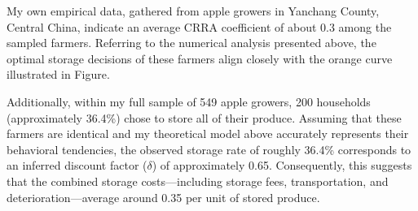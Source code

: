 \documentclass[12pt]{article}
\begin{document}
My own empirical data, gathered from apple growers in Yanchang County, Central China, indicate an average CRRA coefficient of about 0.3 among the sampled farmers. Referring to the numerical analysis presented above, the optimal storage decisions of these farmers align closely with the orange curve illustrated in Figure.

Additionally, within my full sample of 549 apple growers, 200 households (approximately 36.4\%) chose to store all of their produce. Assuming that these farmers are identical and my theoretical model above accurately represents their behavioral tendencies, the observed storage rate of roughly 36.4\% corresponds to an inferred discount factor ($\delta$) of approximately 0.65. Consequently, this suggests that the combined storage costs—including storage fees, transportation, and deterioration—average around 0.35 per unit of stored produce.


\newpage

\end{document}
